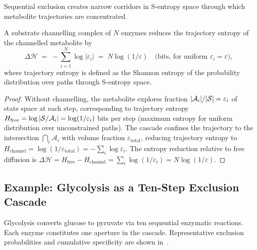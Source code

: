 Sequential exclusion creates narrow corridors in S-entropy space through
which metabolite trajectories are concentrated.

\begin{theorem}
\label{thm:ch03-channelling}
A substrate channelling complex of $N$ enzymes reduces the trajectory
entropy of the channelled metabolite by
\begin{equation}
    \Delta\mathcal{H}
    \;=\;
    -\sum_{i=1}^{N}\log|\varepsilon_i|
    \;=\;
    N\log(1/\varepsilon)
    \quad\text{(bits, for uniform }\varepsilon_i=\varepsilon),
    \label{eq:ch03-channelling-entropy}
\end{equation}
where trajectory entropy is defined as the Shannon entropy of the
probability distribution over paths through S-entropy space.
\end{theorem}

\begin{proof}
Without channelling, the metabolite explores fraction
$|\mathcal{A}_i|/|\mathcal{S}|=\varepsilon_i$ of state space at each step,
corresponding to trajectory entropy
$H_{\mathrm{free}}=\log|\mathcal{S}/\mathcal{A}_i|=\log(1/\varepsilon_i)$ bits
per step (maximum entropy for uniform distribution over unconstrained paths).
The cascade confines the trajectory to the intersection
$\bigcap_i\mathcal{A}_i$ with volume fraction $\varepsilon_{\mathrm{total}}$,
reducing trajectory entropy to
$H_{\mathrm{channel}}=\log(1/\varepsilon_{\mathrm{total}})=
-\sum_i\log\varepsilon_i$.
The entropy reduction relative to free diffusion is
$\Delta\mathcal{H}=H_{\mathrm{free}}-H_{\mathrm{channel}}
=\sum_i\log(1/\varepsilon_i)=N\log(1/\varepsilon)$.
\end{proof}

\subsection{Example: Glycolysis as a Ten-Step Exclusion Cascade}

Glycolysis converts glucose to pyruvate via ten sequential enzymatic
reactions.  Each enzyme constitutes one aperture in the cascade.
Representative exclusion probabilities and cumulative specificity are
shown in~.

